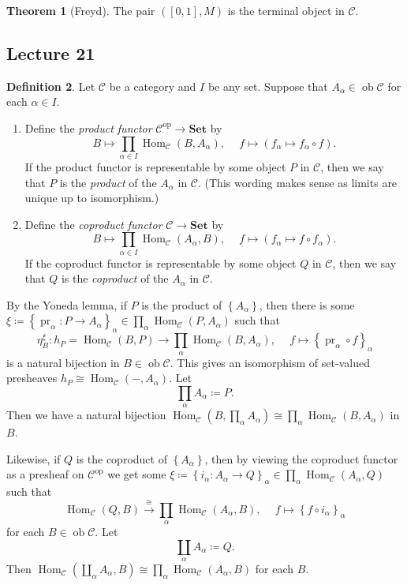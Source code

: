 \documentclass[10pt,letterpaper,cm]{nupset}
\theoremstyle{definition}
\newtheorem{definition}{Definition}[subsection]
\theoremstyle{theorem}
\newtheorem{theorem}[definition]{Theorem}
\theoremstyle{remark}
\newcommand{\1}{\mathbf{1}}
\renewcommand{\c}{\mathscr{C}}
\newcommand{\0}{\vec 0}
\DeclareMathOperator{\op}{op}
\DeclareMathOperator{\ob}{ob}
\DeclareMathOperator{\pr}{pr}
\DeclareMathOperator{\Hom}{Hom}
\begin{document}
\begin{theorem}[Freyd]
The pair $\left(\left[0,1\right], M\right)$ is the terminal object in $\c$.
\end{theorem}

\subsection{Lecture 21}

\begin{definition} Let $\c$ be a category and $I$ be any set. Suppose that $A_{\alpha} \in \ob \c$ for each $\alpha \in I$.
\begin{enumerate}
\item  Define the \textit{product functor} $\c^{\op} \to \mathbf{Set}$ by $$B \mapsto \prod_{\alpha \in I}\Hom_{\c}(B, A_{\alpha}), \  \quad f \mapsto \left(f_{\alpha} \mapsto f_{\alpha} \circ f\right).$$ If the product functor is representable by some object $P$ in $\c$, then we say that $P$ is the \textit{product} of the $A_{\alpha}$ in $\c$. (This wording makes sense as limits are unique up to isomorphism.)
\item Define the \textit{coproduct functor} $\c \to \mathbf{Set}$ by $$ B \mapsto \prod_{\alpha \in I} \Hom_{\c}(A_{\alpha}, B), \  \quad f \mapsto \left(f_{\alpha} \mapsto f \circ f_{\alpha}\right).$$ If the coproduct functor is representable by some object $Q$ in $\c$, then we say that $Q$ is the \textit{coproduct} of the $A_{\alpha}$ in $\c$.
\end{enumerate}
\end{definition}

 By the Yoneda lemma, if $P$ is the product of $\left\{A_{\alpha}\right\}$, then there is some $\xi \coloneqq \left\{\pr_{\alpha} : P \to A_{\alpha}\right\}_{\alpha} \in \prod_{\alpha}\Hom_{\c}(P, A_{\alpha})$ such that $$\eta^{\xi}_B : h_P = \Hom_{\c}(B, P) \to \prod_{\alpha}\Hom_{\c} (B, A_{\alpha}), \  \quad f \mapsto \left\{\pr_{\alpha} \circ f\right\}_{\alpha}$$ is a natural bijection in $B \in \ob \c$. This gives an isomorphism of set-valued presheaves $h_P \cong \Hom_{\c}(-, A_{\alpha})$. Let $$\prod_{\alpha} A_{\alpha} \coloneqq  P.$$ Then we have a natural bijection $\Hom_{\c}(B, \prod_{\alpha} A_{\alpha}) \cong \prod_{\alpha} \Hom_{\c}(B, A_{\alpha})$ in $B$.

 Likewise, if $Q$ is the coproduct of $\left\{A_{\alpha}\right\}$, then by viewing the coproduct functor as a presheaf on $\c^{\op}$ we get some $\xi\coloneqq  \left\{i_{\alpha} : A_{\alpha} \to Q\right\}_{\alpha} \in \prod_{\alpha}\Hom_{\c}(A_{\alpha}, Q)$ such that $$\Hom_{\c} (Q, B) \overset{\cong}{\longrightarrow} \prod_{\alpha}\Hom_{\c}(A_{\alpha}, B), \ \quad f \mapsto \left\{f \circ i_{\alpha}\right\}_{\alpha}$$ for each $B\in \ob \c$. Let $$\coprod_{\alpha} A_{\alpha} \coloneqq  Q.$$ Then $\Hom_{\c}\left(\coprod_{\alpha} A_{\alpha}, B\right) \cong \prod_{\alpha}\Hom_{\c}(A_{\alpha}, B)$ for each $B$.
 
\end{document}
